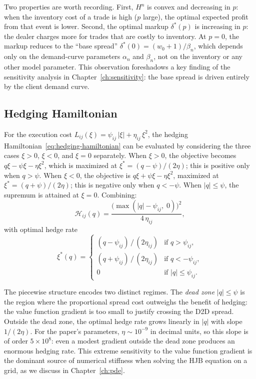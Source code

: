 Two properties are worth recording. First, $H^n$ is convex and decreasing in $p$: when the inventory cost of a trade is high ($p$ large), the optimal expected profit from that event is lower. Second, the optimal markup $\delta^*(p)$ is increasing in $p$: the dealer charges more for trades that are costly to inventory. At $p = 0$, the markup reduces to the ``base spread'' $\delta^*(0) = (w_0 + 1)/\beta_n$, which depends only on the demand-curve parameters $\alpha_n$ and $\beta_n$, not on the inventory or any other model parameter. This observation foreshadows a key finding of the sensitivity analysis in Chapter~\ref{ch:sensitivity}: the base spread is driven entirely by the client demand curve.


\subsection{Hedging Hamiltonian}
\label{sec:model-H-hedging}

For the execution cost $L_{ij}(\xi) = \psi_{ij}\,|\xi| + \eta_{ij}\,\xi^2$, the hedging Hamiltonian~\eqref{eq:hedging-hamiltonian} can be evaluated by considering the three cases $\xi > 0$, $\xi < 0$, and $\xi = 0$ separately. When $\xi > 0$, the objective becomes $q\xi - \psi\xi - \eta\xi^2$, which is maximized at $\xi^* = (q - \psi)/(2\eta)$; this is positive only when $q > \psi$. When $\xi < 0$, the objective is $q\xi + \psi\xi - \eta\xi^2$, maximized at $\xi^* = (q + \psi)/(2\eta)$; this is negative only when $q < -\psi$. When $|q| \leq \psi$, the supremum is attained at $\xi = 0$. Combining:
\begin{equation}
  \label{eq:H-hedge-closed}
  \mathcal{H}_{ij}(q) = \frac{\bigl(\max(|q| - \psi_{ij},\;0)\bigr)^2}{4\,\eta_{ij}},
\end{equation}
with optimal hedge rate
\begin{equation}
  \label{eq:optimal-hedge-rate}
  \xi^*(q) = \begin{cases}
    (q - \psi_{ij})\,/\,(2\eta_{ij}) & \text{if } q > \psi_{ij}, \\[2pt]
    (q + \psi_{ij})\,/\,(2\eta_{ij}) & \text{if } q < -\psi_{ij}, \\[2pt]
    0 & \text{if } |q| \leq \psi_{ij}.
  \end{cases}
\end{equation}

The piecewise structure encodes two distinct regimes. The \emph{dead zone} $|q| \leq \psi$ is the region where the proportional spread cost outweighs the benefit of hedging: the value function gradient is too small to justify crossing the D2D spread. Outside the dead zone, the optimal hedge rate grows linearly in $|q|$ with slope $1/(2\eta)$. For the paper's parameters, $\eta \sim 10^{-9}$ in decimal units, so this slope is of order $5 \times 10^8$: even a modest gradient outside the dead zone produces an enormous hedging rate. This extreme sensitivity to the value function gradient is the dominant source of numerical stiffness when solving the HJB equation on a grid, as we discuss in Chapter~\ref{ch:pde}.


